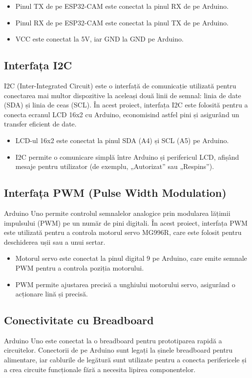 \documentclass[a4paper,12pt]{report}
\begin{document}
\begin{itemize}
    \item Pinul TX de pe ESP32-CAM este conectat la pinul RX de pe Arduino.
    \item Pinul RX de pe ESP32-CAM este conectat la pinul TX de pe Arduino.
    \item VCC este conectat la 5V, iar GND la GND pe Arduino.
\end{itemize}

\subsection{Interfața I2C}
I2C (Inter-Integrated Circuit) este o interfață de comunicație utilizată pentru conectarea mai multor dispozitive la aceleași două linii de semnal: linia de date (SDA) și linia de ceas (SCL). În acest proiect, interfața I2C este folosită pentru a conecta ecranul LCD 16x2 cu Arduino, economisind astfel pini și asigurând un transfer eficient de date.

\begin{itemize}
    \item LCD-ul 16x2 este conectat la pinul SDA (A4) și SCL (A5) pe Arduino.
    \item I2C permite o comunicare simplă între Arduino și perifericul LCD, afișând mesaje pentru utilizator (de exemplu, „Autorizat” sau „Respins”).
\end{itemize}

\subsection{Interfața PWM (Pulse Width Modulation)}
Arduino Uno permite controlul semnalelor analogice prin modularea lățimii impulsului (PWM) pe un număr de pini digitali. În acest proiect, interfața PWM este utilizată pentru a controla motorul servo MG996R, care este folosit pentru deschiderea ușii sau a unui sertar.

\begin{itemize}
    \item Motorul servo este conectat la pinul digital 9 pe Arduino, care emite semnale PWM pentru a controla poziția motorului.
    \item PWM permite ajustarea precisă a unghiului motorului servo, asigurând o acționare lină și precisă.
\end{itemize}

\subsection{Conectivitate cu Breadboard}
Arduino Uno este conectat la o breadboard pentru prototiparea rapidă a circuitelor. Conectorii de pe Arduino sunt legați la șinele breadboard pentru alimentare, iar cablurile de legătură sunt utilizate pentru a conecta perifericele și a crea circuite funcționale fără a necesita lipirea componentelor.
\end{document}
